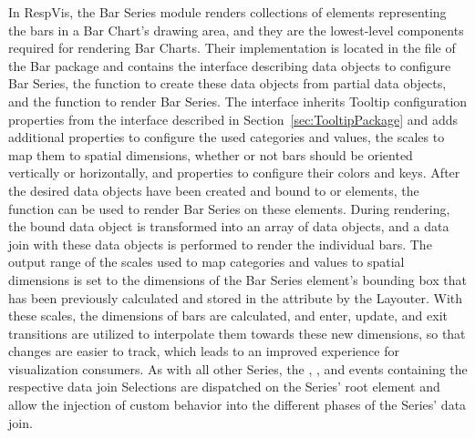 In RespVis, the Bar Series module renders collections of
 elements representing the bars in a Bar Chart's drawing
area, and they are the lowest-level components required for rendering
Bar Charts. Their implementation is located in the
 file of the Bar package and contains the
 interface describing data objects to configure Bar
Series, the  function to create these data objects
from partial data objects, and the  function to
render Bar Series. The  interface inherits Tooltip
configuration properties from the 
interface described in Section~\ref{sec:TooltipPackage} and adds
additional properties to configure the used categories and values, the
scales to map them to spatial dimensions, whether or not bars should
be oriented vertically or horizontally, and properties to configure
their colors and keys. After the desired  data objects
have been created and bound to  or 
elements, the  function can be used to render
Bar Series on these elements. During rendering, the bound
 data object is transformed into an array of
 data objects, and a data join with these data objects is
performed to render the individual bars. The output range of the
scales used to map categories and values to spatial dimensions is set
to the dimensions of the Bar Series element's bounding box that has
been previously calculated and stored in the 
attribute by the Layouter. With these scales, the dimensions of bars
are calculated, and enter, update, and exit transitions are utilized
to interpolate them towards these new dimensions, so that changes are
easier to track, which leads to an improved experience for
visualization consumers. As with all other Series, the ,
, and  events containing the respective data
join Selections are dispatched on the Series' root element and allow
the injection of custom behavior into the different phases of the
Series' data join.

